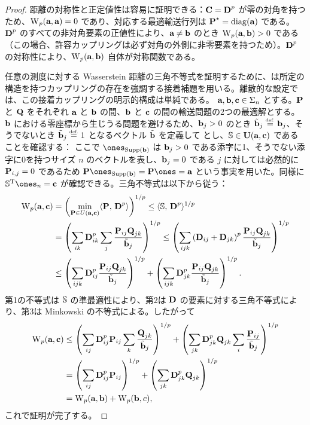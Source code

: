 \begin{proof}
距離の対称性と正定値性は容易に証明できる：$\C = \distD^p$ が零の対角を持つため、$\WassD_p(\a,\a)=0$ であり、対応する最適輸送行列は $\P^\star=\diag(\a)$ である。$\distD^p$ のすべての非対角要素の正値性により、$\a\ne \b$ のとき $\WassD_p(\a,\b)>0$ である（この場合、許容カップリングは必ず対角の外側に非零要素を持つため）。$\distD^p$ の対称性により、$\WassD_p(\a,\b)$ 自体が対称関数である。


任意の測度に対する Wasserstein 距離の三角不等式を証明するために、\citet[Theorem 7.3]{Villani03}は所定の構造を持つカップリングの存在を強調する接着補題を用いる。離散的な設定では、この接着カップリングの明示的構成は単純である。
%
$\a,\b,\VectMode{c} \in\simplex_n$ とする。$\P$ と $\Q$ をそれぞれ $\a$ と $\b$ の間、$\b$ と $\VectMode{c}$ の間の輸送問題の2つの最適解とする。
%
$\b$ における零座標から生じうる問題を避けるため、$\b_j>0$ のとき $\tilde\b_j \eqdef \b_j$、そうでないとき $\tilde{\b}_j\eqdef 1$ となるベクトル $\tilde{\b}$ を定義して
とし、$\SS \in \CouplingsD(\a,\VectMode{c})$ であることを確認する：
ここで $\ones_{\Supp(\b)}$ は $\b_j>0$ である添字に1、そうでない添字に0を持つサイズ $n$ のベクトルを表し、$\b_j=0$ である $j$ に対しては必然的に $\P_{i,j} = 0$ であるため $\P \ones_{\Supp(\b)} = \P \ones = \a$ という事実を用いた。同様に $\transp{\SS} \ones_n = \VectMode{c}$ が確認できる。三角不等式は以下から従う：
\begin{align*}
\WassD_p(\a,\VectMode{c})&=\left(\min_{\P\in U(\a,\VectMode{c})}\dotp{\P}{\distD^p}\right)^{1/p} \leq \dotp{\SS}{\distD^p}^{1/p}\\
&= \left(\sum_{ik} \distD^p_{ik}\sum_{j} \frac{\P_{ij}\Q_{jk}}{\tilde{\b}_j}\right)^{1/p} \leq \left(\sum_{ijk} \left(\distD_{ij}+\distD_{jk}\right)^p \frac{\P_{ij}\Q_{jk}}{\tilde{\b}_j}\right)^{1/p} \\
& \leq \left(\sum_{ijk} \distD^p_{ij} \frac{\P_{ij}\Q_{jk}}{\tilde{\b}_j}\right)^{1/p} + \left(\sum_{ijk}\distD^p_{jk} \frac{\P_{ij}\Q_{jk}}{\tilde{\b}_j}\right)^{1/p}.
\end{align*}
第1の不等式は $\SS$ の準最適性により、第2は $\distD$ の要素に対する三角不等式により、第3は Minkowski の不等式による。したがって
\begin{align*}
\WassD_p(\a,\VectMode{c})& \leq \left(\sum_{ij} \distD^p_{ij}\P_{ij} \sum_k \frac{\Q_{jk}}{\tilde{\b}_j}\right)^{1/p} + \left(\sum_{jk} \distD^p_{jk} \Q_{jk} \sum_i \frac{\P_{ij}}{\tilde{\b}_j}\right)^{1/p}\\
&= \left(\sum_{ij} \distD^p_{ij}\P_{ij}\right)^{1/p} + \left(\sum_{jk} \distD^p_{jk} \Q_{jk}\right)^{1/p}\\
&= \WassD_p(\a,\b) +\WassD_p(\b,\c),
\end{align*}
これで証明が完了する。
\end{proof}


